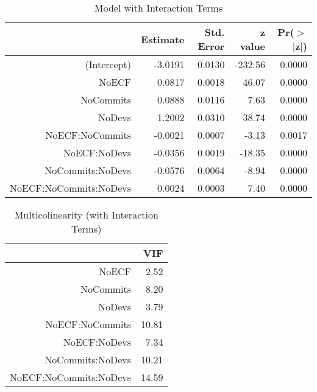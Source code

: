 \documentclass[times]{smrauth}
\newcommand{\red}[1]{ {\color{red}#1} }
\begin{document}
\begin{table}[tbp]
\centering
\caption{Model with Interaction Terms} 
\label{tab:testingWithinteractionterms}
\begin{tabular}{rrrrr}
  \hline
 & Estimate & Std. Error & z value & Pr($>$ $|$z$|$) \\ 
  \hline
(Intercept) & -3.0191 & 0.0130 & -232.56 & 0.0000 \\ 
  NoECF & 0.0817 & 0.0018 & 46.07 & 0.0000 \\ 
  NoCommits & 0.0888 & 0.0116 & 7.63 & 0.0000 \\ 
  NoDevs & 1.2002 & 0.0310 & 38.74 & 0.0000 \\ 
  NoECF:NoCommits & -0.0021 & 0.0007 & -3.13 & 0.0017 \\ 
  NoECF:NoDevs & -0.0356 & 0.0019 & -18.35 & 0.0000 \\ 
  NoCommits:NoDevs & -0.0576 & 0.0064 & -8.94 & 0.0000 \\ 
  NoECF:NoCommits:NoDevs & 0.0024 & 0.0003 & 7.40 & 0.0000 \\ 
   \hline
\end{tabular}
\end{table}%


\begin{table}[tbp]
\centering
\caption{Multicolinearity (with Interaction Terms)} 
\label{tab:collinearityvif}
\begin{tabular}{rr}
  \hline
 & VIF\\ 
  \hline
NoECF & 2.52 \\ 
  NoCommits & 8.20 \\ 
  NoDevs & 3.79 \\ 
  \red{NoECF:NoCommits} & 10.81 \\ 
  NoECF:NoDevs & 7.34 \\ 
  \red{NoCommits:NoDevs} & 10.21 \\ 
  \red{NoECF:NoCommits:NoDevs} & 14.59 \\ 
   \hline
\end{tabular}
\end{table}
\end{document}
